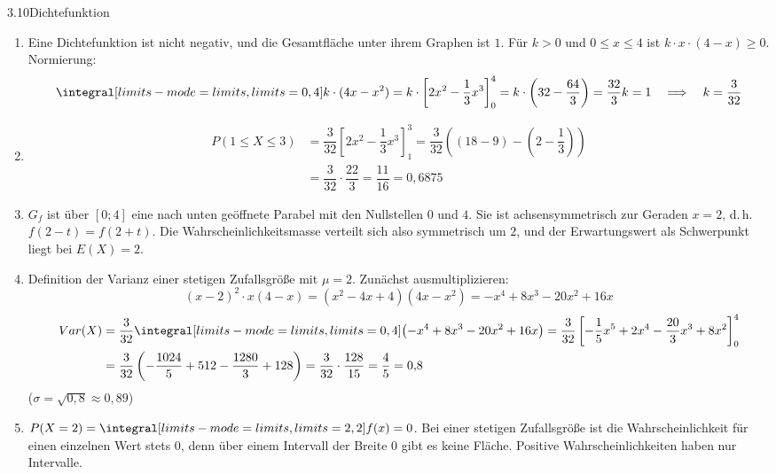 
\begin{loesung}{3.10}{Dichtefunktion}
\begin{enumerate}[label=\alph*)]
  \item Eine Dichtefunktion ist nicht negativ, und die Gesamtfläche unter ihrem Graphen ist $1$. Für $k>0$ und $0\leq x\leq 4$ ist $k\cdot x\cdot(4-x)\geq 0$. Normierung:
  \[\integral[limits-mode=limits,limits={0, 4}]{k\cdot(4x-x^2)} = k\cdot\left[2x^2-\dfrac{1}{3}x^3\right]_0^4 = k\cdot\left(32-\dfrac{64}{3}\right) = \dfrac{32}{3}k = 1\quad\Longrightarrow\quad k = \dfrac{3}{32}\]
  \item \begin{align*}
    P(1\leq X\leq 3) &= \dfrac{3}{32}\left[2x^2-\dfrac{1}{3}x^3\right]_1^3 = \dfrac{3}{32}\left((18-9)-\left(2-\dfrac{1}{3}\right)\right)\\
    &= \dfrac{3}{32}\cdot\dfrac{22}{3} = \dfrac{11}{16} = 0{,}6875
  \end{align*}
  \item $G_f$ ist über $[0;4]$ eine nach unten geöffnete Parabel mit den Nullstellen $0$ und $4$. Sie ist achsensymmetrisch zur Geraden $x=2$, d.\,h. $f(2-t) = f(2+t)$. Die Wahrscheinlichkeitsmasse verteilt sich also symmetrisch um $2$, und der Erwartungswert als \glqq Schwerpunkt\grqq{} liegt bei $E(X)=2$.
  \item Definition der Varianz einer stetigen Zufallsgröße mit $\mu=2$. Zunächst ausmultiplizieren:
  \[(x-2)^2\cdot x(4-x) = (x^2-4x+4)(4x-x^2) = -x^4+8x^3-20x^2+16x\]
  \begin{align*}
    Var(X) &= \dfrac{3}{32}\integral[limits-mode=limits,limits={0, 4}]{\left(-x^4+8x^3-20x^2+16x\right)} = \dfrac{3}{32}\left[-\dfrac{1}{5}x^5+2x^4-\dfrac{20}{3}x^3+8x^2\right]_0^4\\
    &= \dfrac{3}{32}\left(-\dfrac{1024}{5}+512-\dfrac{1280}{3}+128\right) = \dfrac{3}{32}\cdot\dfrac{128}{15} = \dfrac{4}{5} = 0{,}8
  \end{align*}
  ($\sigma = \sqrt{0{,}8}\approx 0{,}89$)
  \item $P(X=2) = \integral[limits-mode=limits,limits={2, 2}]{f(x)} = 0$. Bei einer stetigen Zufallsgröße ist die Wahrscheinlichkeit für einen einzelnen Wert stets $0$, denn über einem Intervall der Breite $0$ gibt es keine Fläche. Positive Wahrscheinlichkeiten haben nur Intervalle.
\end{enumerate}
\end{loesung}

